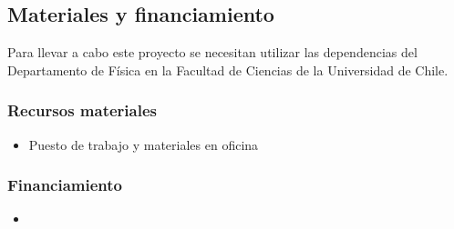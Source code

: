 \documentclass{proyectotesis}
\begin{document}
\subsection{Materiales y financiamiento}

Para llevar a cabo este proyecto se necesitan utilizar las dependencias del Departamento de Física en la Facultad de Ciencias de la Universidad de Chile. %

\subsubsection*{Recursos materiales}

\begin{itemize}
\item Puesto de trabajo y materiales en oficina

\end{itemize}
\subsubsection*{Financiamiento}
\begin{itemize}
\item
\end{itemize}



\end{document}
